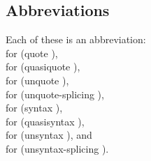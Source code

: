\subsection{Abbreviations}\unsection
\label{quotesection}

\begin{entry}{%
}

Each of these is an abbreviation:
\\\quad{}\singlequote{}
for {\cf (quote )},
\\\quad{}\backquote{}
for {\cf (quasiquote )},
\\\quad\mainschindex{,}{\cf,}
for {\cf (unquote )},
\\\quad{}\atsign{}
for {\cf (unquote-splicing )},
\\\quad{}
for {\cf (syntax )},
\\\quad{}
for {\cf (quasisyntax )},
\\\quad\sharpindex{,}{\cf\#,}
for {\cf (unsyntax )}, and
\\\quad{}
for {\cf (unsyntax-splicing )}.
\end{entry}


